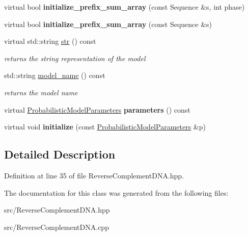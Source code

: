 \begin{DoxyCompactItemize}
virtual bool {\bfseries initialize\+\_\+prefix\+\_\+sum\+\_\+array} (const Sequence \&s, int phase)
\item 
\mbox{\label{classtops_1_1ReverseComplementDNA_ab27b69804bef52fd2c6361135a32356d}} 
virtual bool {\bfseries initialize\+\_\+prefix\+\_\+sum\+\_\+array} (const Sequence \&s)
\item 
\mbox{\label{classtops_1_1ReverseComplementDNA_ac484d2906daeb3c17da6828d0aa164c0}} 
virtual std\+::string \hyperlink{classtops_1_1ReverseComplementDNA_ac484d2906daeb3c17da6828d0aa164c0}{str} () const
\begin{DoxyCompactList}\small\item\em returns the string representation of the model \end{DoxyCompactList}\item 
\mbox{\label{classtops_1_1ReverseComplementDNA_a9cb612e503a0943b00deaa51440e16cc}} 
std\+::string \hyperlink{classtops_1_1ReverseComplementDNA_a9cb612e503a0943b00deaa51440e16cc}{model\+\_\+name} () const
\begin{DoxyCompactList}\small\item\em returns the model name \end{DoxyCompactList}\item 
\mbox{\label{classtops_1_1ReverseComplementDNA_a495ca02345d01941f85ae6f52ee4b19e}} 
virtual \hyperlink{classtops_1_1ProbabilisticModelParameters}{Probabilistic\+Model\+Parameters} {\bfseries parameters} () const
\item 
\mbox{\label{classtops_1_1ReverseComplementDNA_acb70f08c6eddae086d56e377b1b783dd}} 
virtual void {\bfseries initialize} (const \hyperlink{classtops_1_1ProbabilisticModelParameters}{Probabilistic\+Model\+Parameters} \&p)
\end{DoxyCompactItemize}


\subsection{Detailed Description}


Definition at line 35 of file Reverse\+Complement\+D\+N\+A.\+hpp.



The documentation for this class was generated from the following files\+:\begin{DoxyCompactItemize}
\item 
src/Reverse\+Complement\+D\+N\+A.\+hpp\item 
src/Reverse\+Complement\+D\+N\+A.\+cpp\end{DoxyCompactItemize}

